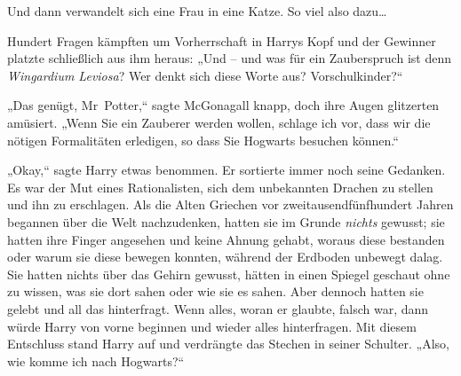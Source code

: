 Und dann verwandelt sich eine Frau in eine Katze. So viel also dazu…

Hundert Fragen kämpften um Vorherrschaft in Harrys Kopf und der Gewinner platzte schließlich aus ihm heraus: „Und – und was für ein Zauberspruch ist denn \emph{Wingardium Leviosa}? Wer denkt sich diese Worte aus? Vorschulkinder?“

„Das genügt, Mr~Potter,“ sagte McGonagall knapp, doch ihre Augen glitzerten amüsiert. „Wenn Sie ein Zauberer werden wollen, schlage ich vor, dass wir die nötigen Formalitäten erledigen, so dass Sie Hogwarts besuchen können.“

„Okay,“ sagte Harry etwas benommen. Er sortierte immer noch seine Gedanken. Es war der Mut eines Rationalisten, sich dem unbekannten Drachen zu stellen und ihn zu erschlagen. Als die Alten Griechen vor zweitausendfünfhundert Jahren begannen über die Welt nachzudenken, hatten sie im Grunde \emph{nichts} gewusst; sie hatten ihre Finger angesehen und keine Ahnung gehabt, woraus diese bestanden oder warum sie diese bewegen konnten, während der Erdboden unbewegt dalag. Sie hatten nichts über das Gehirn gewusst, hätten in einen Spiegel geschaut ohne zu wissen, was sie dort sahen oder wie sie es sahen. Aber dennoch hatten sie gelebt und all das hinterfragt. Wenn alles, woran er glaubte, falsch war, dann würde Harry von vorne beginnen und wieder alles hinterfragen.
Mit diesem Entschluss stand Harry auf und verdrängte das Stechen in seiner Schulter. „Also, wie komme ich nach Hogwarts?“

